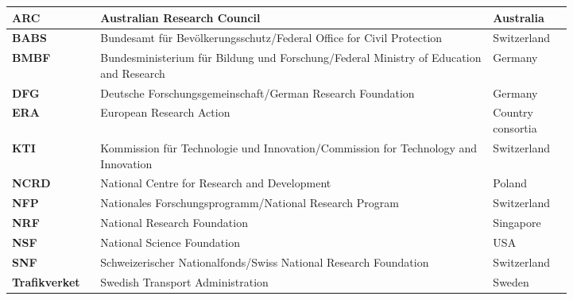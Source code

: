 \begin{tabular}[]{p{0.1\linewidth} p{0.6\linewidth} p{0.12\linewidth}} %
\hline
\textbf{ARC} & Australian Research Council  & Australia\\
\hline
\textbf{BABS} & Bundesamt für Bevölkerungsschutz/Federal Office for Civil Protection & Switzerland\\
\hline
\textbf{BMBF} & Bundesministerium für Bildung und Forschung/Federal Ministry of Education and Research & Germany\\
\hline
\textbf{DFG} & Deutsche Forschungsgemeinschaft/German Research Foundation & Germany\\
\hline
\textbf{ERA} & European Research Action & Country consortia\\
\hline
\textbf{KTI} & Kommission für Technologie und Innovation/Commission for Technology and Innovation  & Switzerland\\
\hline
\textbf{NCRD} & National Centre for Research and Development & Poland\\
\hline
\textbf{NFP} & Nationales Forschungsprogramm/National Research Program & Switzerland\\
\hline
\textbf{NRF} & National Research Foundation & Singapore\\
\hline
\textbf{NSF} & National Science Foundation & USA\\
\hline
\textbf{SNF} & Schweizerischer Nationalfonds/Swiss National Research Foundation & Switzerland\\
\hline
\textbf{Trafikverket} & Swedish Transport Administration & Sweden\\
\hline
\end{tabular}

